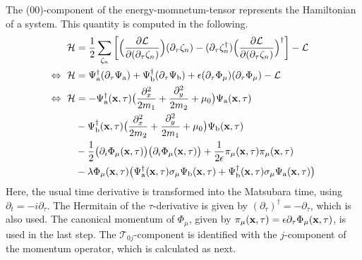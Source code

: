 The (00)-component of the energy-momnetum-tensor represents the Hamiltonian of a system.
This quantity is computed in the following.
%
\begin{align}
	\mathcal{H} &= 
		\frac{1}{2} \sum\limits_{\zeta_{n}} \bigg[
		\Big(\frac{\partial\mathcal{L}}{\partial(\partial_{\tau}\zeta_{n})}\Big) (\partial_{\tau}\zeta_{n}) 
		-
		(\partial_{\tau}\zeta_{n}^{\dag}) \Big(\frac{\partial\mathcal{L}}{\partial(\partial_{\tau}\zeta_{n})}\Big)^{\dag}
		\bigg]
		-
		\mathcal{L}
		\notag \\
	\Leftrightarrow\ \mathcal{H} &= 
		\Psi_{\mathrm{a}}^{\dag} (\partial_{\tau}\Psi_{\mathrm{a}}) 
		+
		\Psi_{\mathrm{b}}^{\dag} (\partial_{\tau}\Psi_{\mathrm{b}}) 
		+
		\epsilon  (\partial_{\tau} \Phi_{\mu}) (\partial_{\tau} \Phi_{\mu}) 
		-
		\mathcal{L}
	\notag \\
	\Leftrightarrow\ \mathcal{H} &= 
		-
		\Psi_{\mathrm{a}}^{\dag}(\vb{x},\tau) \big(\frac{\partial_{x}^{2}}{2m_{1}} + \frac{\partial_{y}^{2}}{2m_{2}} + \mu_{0}\big) \Psi_{\mathrm{a}}(\vb{x},\tau)
		\notag \\&
		- 
		\Psi_{\mathrm{b}}^{\dag}(\vb{x},\tau) \big(\frac{\partial_{x}^{2}}{2m_{2}} + \frac{\partial_{y}^{2}}{2m_{1}} + \mu_{0}\big) \Psi_{\mathrm{b}}(\vb{x},\tau)
		\notag \\&
		- 
		\frac{1}{2} \big(\partial_{i} \Phi_{\mu}(\vb{x},\tau)\big) \big(\partial_{i} \Phi_{\mu}(\vb{x},\tau)\big)
		+ 
		\frac{1}{2\epsilon} \pi_{\mu}(\vb{x},\tau) \pi_{\mu}(\vb{x},\tau)
		\notag \\&
		-	
		\lambda \Phi_{\mu}(\vb{x},\tau) \big(\Psi_{\mathrm{a}}^{\dag}(\vb{x},\tau) \sigma_{\mu} \Psi_{\mathrm{b}}(\vb{x},\tau) + \Psi_{\mathrm{b}}^{\dag}(\vb{x},\tau) \sigma_{\mu} \Psi_{\mathrm{a}}(\vb{x},\tau)\big)
\end{align}
%
Here, the usual time derivative is transformed into the Matsubara time, using $\partial_{t} = -i\partial_{\tau}$.
The Hermitain of the $\tau$-derivative is given by $(\partial_{\tau})^{\dag} = -\partial_{\tau}$, which is also used.
The canonical momentum of $\Phi_{\mu}$, given by $\pi_{\mu}(\vb{x},\tau) = \epsilon \partial_{\tau} \Phi_{\mu}(\vb{x},\tau)$, is used in the last step.
The $\mathcal{T}_{0j}$-component is identified with the $j$-component of the momentum operator, which is calculated as next.
%
